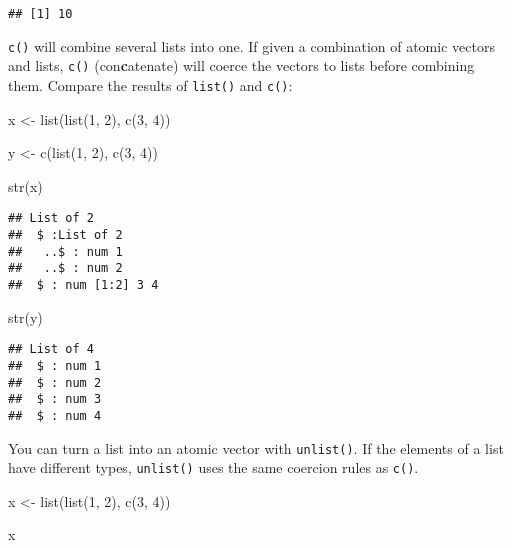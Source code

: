 \documentclass[
]{book}
\newenvironment{Shaded}{\begin{snugshade}}{\end{snugshade}}
\newcommand{\DecValTok}[1]{\textcolor[rgb]{0.00,0.00,0.81}{#1}}
\newcommand{\FunctionTok}[1]{\textcolor[rgb]{0.00,0.00,0.00}{#1}}
\newcommand{\NormalTok}[1]{#1}
\newcommand{\OtherTok}[1]{\textcolor[rgb]{0.56,0.35,0.01}{#1}}
\begin{document}
\begin{verbatim}
## [1] 10
\end{verbatim}

\texttt{c()} will combine several lists into one. If given a combination of atomic vectors and lists, \texttt{c()} (con\textbf{c}atenate) will coerce the vectors to lists before combining them. Compare the results of \texttt{list()} and \texttt{c()}:

\begin{Shaded}
\begin{Highlighting}[]
\NormalTok{x }\OtherTok{\textless{}{-}} \FunctionTok{list}\NormalTok{(}\FunctionTok{list}\NormalTok{(}\DecValTok{1}\NormalTok{, }\DecValTok{2}\NormalTok{), }\FunctionTok{c}\NormalTok{(}\DecValTok{3}\NormalTok{, }\DecValTok{4}\NormalTok{))}

\NormalTok{y }\OtherTok{\textless{}{-}} \FunctionTok{c}\NormalTok{(}\FunctionTok{list}\NormalTok{(}\DecValTok{1}\NormalTok{, }\DecValTok{2}\NormalTok{), }\FunctionTok{c}\NormalTok{(}\DecValTok{3}\NormalTok{, }\DecValTok{4}\NormalTok{))}

\FunctionTok{str}\NormalTok{(x)}
\end{Highlighting}
\end{Shaded}

\begin{verbatim}
## List of 2
##  $ :List of 2
##   ..$ : num 1
##   ..$ : num 2
##  $ : num [1:2] 3 4
\end{verbatim}

\begin{Shaded}
\begin{Highlighting}[]
\FunctionTok{str}\NormalTok{(y)}
\end{Highlighting}
\end{Shaded}

\begin{verbatim}
## List of 4
##  $ : num 1
##  $ : num 2
##  $ : num 3
##  $ : num 4
\end{verbatim}

You can turn a list into an atomic vector with \texttt{unlist()}. If the elements of a list have different types, \texttt{unlist()} uses the same coercion rules as \texttt{c()}.

\begin{Shaded}
\begin{Highlighting}[]
\NormalTok{x }\OtherTok{\textless{}{-}} \FunctionTok{list}\NormalTok{(}\FunctionTok{list}\NormalTok{(}\DecValTok{1}\NormalTok{, }\DecValTok{2}\NormalTok{), }\FunctionTok{c}\NormalTok{(}\DecValTok{3}\NormalTok{, }\DecValTok{4}\NormalTok{))}

\NormalTok{x}
\end{Highlighting}
\end{Shaded}
\end{document}
